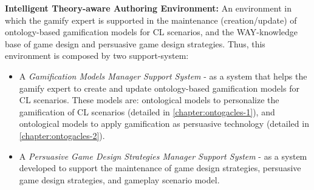 \noindent
\textbf{Intelligent Theory-aware Authoring Environment:} An environment in which the gamify expert is supported in the maintenance (creation/update) of ontology-based gamification models for CL scenarios, and the WAY-knowledge base of game design and persuasive game design strategies. Thus, this environment is composed by two support-system:
\begin{itemize}
\item A \emph{Gamification Models Manager Support System} - as a system that helps the gamify expert to create and update ontology-based gamification models for CL scenarios. 
These models are: ontological models to personalize the gamification of CL scenarios (detailed in \autoref{chapter:ontogacles-1}), and ontological models to apply gamification as persuasive technology (detailed in \autoref{chapter:ontogacles-2}).

\item A \emph{Persuasive Game Design Strategies Manager Support System} - as a system developed to support the maintenance of game design strategies, persuasive game design strategies, and gameplay scenario model.
\end{itemize}






